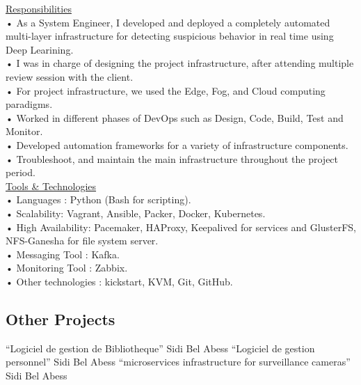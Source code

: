 \documentclass{cv}
\begin{document}
    {
      \underline {Responsibilities}\vspace{.2cm}\\
      • As a System Engineer, I developed and deployed a completely automated multi-layer infrastructure 
      for detecting suspicious behavior in real time using Deep Learining.\\
      • I was in charge of designing the project infrastructure, after attending multiple review session 
      with the client.\\
      • For project infrastructure, we used the Edge, Fog, and Cloud computing paradigms.\\
      • Worked in different phases of DevOps such as Design, Code, Build, Test and Monitor.\\
      • Developed automation frameworks for a variety of infrastructure components.\\
      • Troubleshoot, and maintain the main infrastructure throughout the project period.\\
      \underline {Tools \& Technologies}\\
      • Languages : Python (Bash for scripting).\\
      • Scalability: Vagrant, Ansible, Packer, Docker, Kubernetes.\\
      • High Availability: Pacemaker, HAProxy, Keepalived for services and GlusterFS, NFS-Ganesha for file system server.\\
      • Messaging Tool : Kafka.\\
      • Monitoring Tool : Zabbix.\\
      • Other technologies : kickstart, KVM, Git, GitHub.\\
    }

\subsection{Other Projects}

    {``Logiciel de gestion de Bibliotheque''}
	{Sidi Bel Abess}
	{}
    {``Logiciel de gestion personnel''}
	{Sidi Bel Abess}
	{}
    {``microservices infrastructure for surveillance cameras''}
	{Sidi Bel Abess}
	{}
\end{document}
